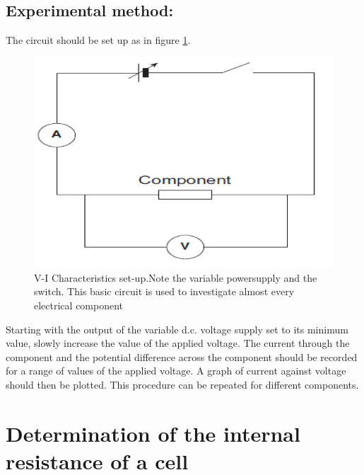 \documentclass{tufte-handout}
\begin{document}
\subsection{Experimental method:} 
The circuit should be set up as in figure \ref{V-I}.
\begin{figure}
\includegraphics[width=\textwidth]{vicac.PNG}
\caption{V-I Characteristics set-up.\newline Note the variable powersupply and the switch. This basic circuit is used to investigate almost every electrical component}
\label{V-I}
\end{figure}

 
Starting with the output of the variable d.c. voltage supply set to its minimum value, slowly increase the value of the applied voltage. The current through the component and the potential difference across the component should be recorded for a range of values of the applied voltage. A graph of current against voltage should then be plotted. This procedure can be repeated for different components.
\section{Determination of the internal resistance of a cell}
\end{document}
